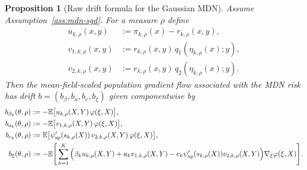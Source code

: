 \documentclass[11pt]{article}
\newtheorem{proposition}[theorem]{Proposition}
\theoremstyle{definition}
\newcommand{\E}{\mathbb{E}}
\begin{document}
\begin{proposition}[Raw drift formula for the Gaussian MDN]
\label{prop:mdn-raw-drift}
Assume Assumption~\ref{ass:mdn-sgd}. For a measure $\rho$ define
\begin{align*}
  u_{k,\rho}(x,y)
  &:=
  \pi_{k,\rho}(x)-r_{k,\rho}(x,y),
  \\
  v_{1,k,\rho}(x,y)
  &:=
  r_{k,\rho}(x,y)\,q_1(\eta_{k,\rho}(x);y),
  \\
  v_{2,k,\rho}(x,y)
  &:=
  r_{k,\rho}(x,y)\,q_2(\eta_{k,\rho}(x);y).
\end{align*}
Then the mean-field-scaled population gradient flow associated with the MDN risk
has drift $b=(b_\beta,b_a,b_c,b_\xi)$ given componentwise by
\begin{align}
  b_{\beta_k}(\theta,\rho)
  &:=
  -
  \E\big[u_{k,\rho}(X,Y)\,\varphi(\xi,X)\big],
  \label{eq:mdn-drift-beta}
  \\
  b_{a_k}(\theta,\rho)
  &:=
  -
  \E\big[v_{1,k,\rho}(X,Y)\,\varphi(\xi,X)\big],
  \label{eq:mdn-drift-a}
  \\
  b_{c_k}(\theta,\rho)
  &:=
  \E\big[\psi_{\rm sp}'(s_{k,\rho}(X))\,v_{2,k,\rho}(X,Y)\,\varphi(\xi,X)\big],
  \label{eq:mdn-drift-c}
  \\
  b_\xi(\theta,\rho)
  &:=
  -
  \E\Bigg[
    \sum_{k=1}^K
    \Big(
      \beta_k u_{k,\rho}(X,Y)
      +
      a_k v_{1,k,\rho}(X,Y)
      -
      c_k\psi_{\rm sp}'(s_{k,\rho}(X))v_{2,k,\rho}(X,Y)
    \Big)\nabla_\xi\varphi(\xi,X)
  \Bigg].
  \label{eq:mdn-drift-xi}
\end{align}
\end{proposition}
\end{document}
